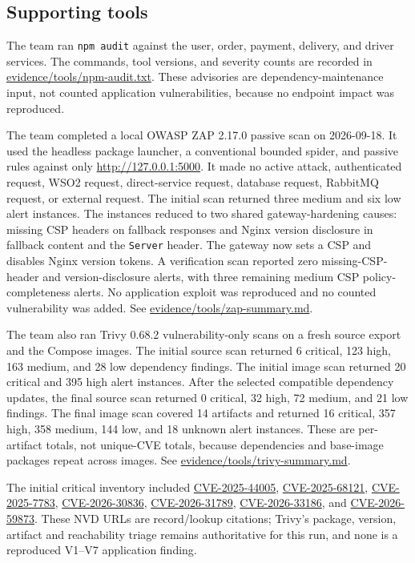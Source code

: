 \documentclass[11pt]{article}
\newcommand{\evidence}[1]{{\small\url{#1}}}
\begin{document}
\subsection{Supporting tools}
The team ran \texttt{npm audit} against the user, order, payment, delivery, and driver services. The commands, tool versions, and severity counts are recorded in \evidence{evidence/tools/npm-audit.txt}. These advisories are dependency-maintenance input, not counted application vulnerabilities, because no endpoint impact was reproduced.

The team completed a local OWASP ZAP 2.17.0 passive scan on 2026-09-18. It used the headless package launcher, a conventional bounded spider, and passive rules against only \url{http://127.0.0.1:5000}. It made no active attack, authenticated request, WSO2 request, direct-service request, database request, RabbitMQ request, or external request. The initial scan returned three medium and six low alert instances. The instances reduced to two shared gateway-hardening causes: missing CSP headers on fallback responses and Nginx version disclosure in fallback content and the \texttt{Server} header. The gateway now sets a CSP and disables Nginx version tokens. A verification scan reported zero missing-CSP-header and version-disclosure alerts, with three remaining medium CSP policy-completeness alerts. No application exploit was reproduced and no counted vulnerability was added. See \evidence{evidence/tools/zap-summary.md}.

The team also ran Trivy 0.68.2 vulnerability-only scans on a fresh source export and the Compose images. The initial source scan returned 6 critical, 123 high, 163 medium, and 28 low dependency findings. The initial image scan returned 20 critical and 395 high alert instances. After the selected compatible dependency updates, the final source scan returned 0 critical, 32 high, 72 medium, and 21 low findings. The final image scan covered 14 artifacts and returned 16 critical, 357 high, 358 medium, 144 low, and 18 unknown alert instances. These are per-artifact totals, not unique-CVE totals, because dependencies and base-image packages repeat across images. See \evidence{evidence/tools/trivy-summary.md}.

The initial critical inventory included \href{https://nvd.nist.gov/vuln/detail/CVE-2025-44005}{CVE-2025-44005}, \href{https://nvd.nist.gov/vuln/detail/CVE-2025-68121}{CVE-2025-68121}, \href{https://nvd.nist.gov/vuln/detail/CVE-2025-7783}{CVE-2025-7783}, \href{https://nvd.nist.gov/vuln/detail/CVE-2026-30836}{CVE-2026-30836}, \href{https://nvd.nist.gov/vuln/detail/CVE-2026-31789}{CVE-2026-31789}, \href{https://nvd.nist.gov/vuln/detail/CVE-2026-33186}{CVE-2026-33186}, and \href{https://nvd.nist.gov/vuln/detail/CVE-2026-59873}{CVE-2026-59873}. These NVD URLs are record/lookup citations; Trivy's package, version, artifact and reachability triage remains authoritative for this run, and none is a reproduced V1--V7 application finding.
\end{document}
